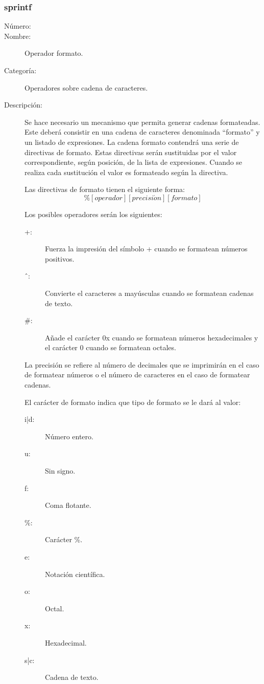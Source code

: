 \subsubsection{sprintf}
\begin{framed}
	\begin{description}
		\item [Número:] \cn
		\item [Nombre:] Operador formato.
		\item [Categoría:] Operadores sobre cadena de caracteres.
		\item [Descripción:] Se hace necesario un mecanismo que permita generar cadenas formateadas. Este deberá consistir
		en una cadena de caracteres denominada ``formato'' y un listado de expresiones. La cadena formato contendrá una serie de
		directivas de formato. Estas directivas serán sustituidas por el valor correspondiente, según posición, de la
		lista de expresiones. Cuando se realiza cada sustitución el valor es formateado según la directiva.
		
		Las directivas de formato tienen el siguiente forma:
		$$\%[operador][precisi\acute{o}n][formato]$$
		
		Los posibles operadores serán los siguientes:
		\begin{description}
			\item[+:] Fuerza la impresión del símbolo + cuando se formatean números positivos.
			\item[\^\ :] Convierte el caracteres a mayúsculas cuando se formatean cadenas de texto.
			\item[\#:] Añade el carácter 0x cuando se formatean números hexadecimales y el carácter 0 cuando se formatean octales.
		\end{description}
	
		La precisión se refiere al número de decimales que se imprimirán en el caso de formatear
		números o el número de caracteres en el caso de formatear cadenas.			

		El carácter de formato indica que tipo de formato se le dará al valor:
		\begin{description}
			\item[i|d:] Número entero.
			\item[u:] Sin signo.
			\item[f:] Coma flotante.
			\item[\%:] Carácter \%.
			\item[e:] Notación científica.
			\item[o:] Octal.
			\item[x:] Hexadecimal.
			\item[s|c:] Cadena de texto.
		\end{description}
	\end {description}
\end{framed}

